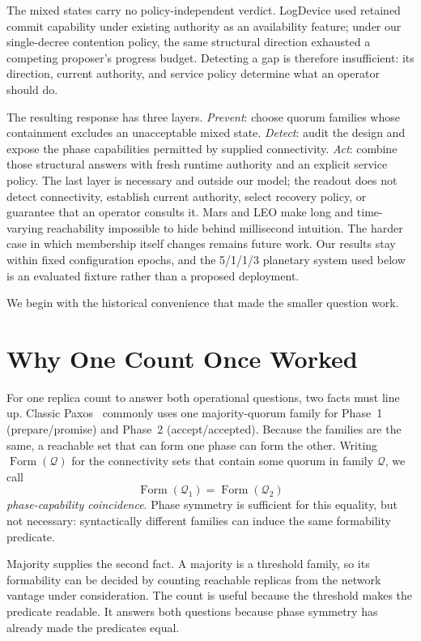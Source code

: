 \documentclass[letterpaper,twocolumn,10pt]{article}
\newcounter{prop}
\begin{document}
The mixed states carry no policy-independent verdict. LogDevice used retained commit capability under existing authority as an availability feature; under our single-decree contention policy, the same structural direction exhausted a competing proposer's progress budget. Detecting a gap is therefore insufficient: its direction, current authority, and service policy determine what an operator should do.

The resulting response has three layers. \emph{Prevent}: choose quorum families whose containment excludes an unacceptable mixed state. \emph{Detect}: audit the design and expose the phase capabilities permitted by supplied connectivity. \emph{Act}: combine those structural answers with fresh runtime authority and an explicit service policy. The last layer is necessary and outside our model; the readout does not detect connectivity, establish current authority, select recovery policy, or guarantee that an operator consults it. Mars and LEO make long and time-varying reachability impossible to hide behind millisecond intuition. The harder case in which membership itself changes remains future work. Our results stay within fixed configuration epochs, and the 5/1/1/3 planetary system used below is an evaluated fixture rather than a proposed deployment.

We begin with the historical convenience that made the smaller question work.


\section{Why One Count Once Worked}
\label{sec:background}

For one replica count to answer both operational questions, two facts must line up. Classic Paxos~\cite{lamport1998} commonly uses one majority-quorum family for Phase~1 (prepare/promise) and Phase~2 (accept/accepted). Because the families are the same, a reachable set that can form one phase can form the other. Writing $\operatorname{Form}(\mathcal Q)$ for the connectivity sets that contain some quorum in family $\mathcal Q$, we call
\[
\operatorname{Form}(\mathcal Q_1)=\operatorname{Form}(\mathcal Q_2)
\]
\emph{phase-capability coincidence}. Phase symmetry is sufficient for this equality, but not necessary: syntactically different families can induce the same formability predicate.

Majority supplies the second fact. A majority is a threshold family, so its formability can be decided by counting reachable replicas from the network vantage under consideration. The count is useful because the threshold makes the predicate readable. It answers both questions because phase symmetry has already made the predicates equal.
\end{document}
